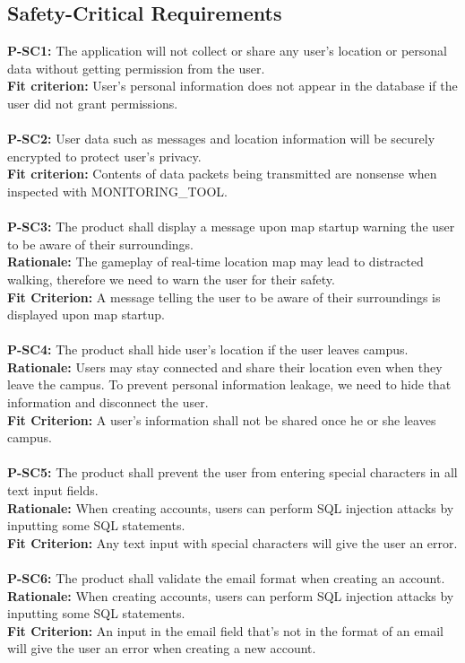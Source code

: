 \documentclass[12pt]{article}
\begin{document}
\subsection{Safety-Critical Requirements}
  \textbf{P-SC1:} The application will not collect or share any user’s location or personal data without getting permission from the user.\\
  \textbf{Fit criterion:} User’s personal information does not appear in the database if the user did not grant permissions.\\\\
  \textbf{P-SC2:} User data such as messages and location information will be securely encrypted to protect user’s privacy.\\
  \textbf{Fit criterion:} Contents of data packets being transmitted are nonsense when inspected with MONITORING\_TOOL.\\\\
  \textbf{P-SC3:} The product shall display a message upon map startup warning the user to be aware of their surroundings.\\
  \textbf{Rationale:} The gameplay of real-time location map may lead to distracted walking, therefore we need to warn the user for their safety.\\
  \textbf{Fit Criterion:} A message telling the user to be aware of their surroundings is displayed upon map startup.\\\\
  \textbf{P-SC4:} The product shall hide user's location if the user leaves campus.\\
  \textbf{Rationale:} Users may stay connected and share their location even when they leave the campus. To prevent personal information leakage, we need to hide that information and disconnect the user.\\
  \textbf{Fit Criterion:} A user's information shall not be shared once he or she leaves campus.\\\\
  \textbf{P-SC5:} The product shall prevent the user from entering special characters in all text input fields.\\
  \textbf{Rationale:} When creating accounts, users can perform SQL injection attacks by inputting some SQL statements.\\
  \textbf{Fit Criterion:} Any text input with special characters will give the user an error.\\\\
  \textbf{P-SC6:} The product shall validate the email format when creating an account.\\
  \textbf{Rationale:} When creating accounts, users can perform SQL injection attacks by inputting some SQL statements.\\
  \textbf{Fit Criterion:} An input in the email field that's not in the format of an email will give the user an error when creating a new account.\\\\
\end{document}
